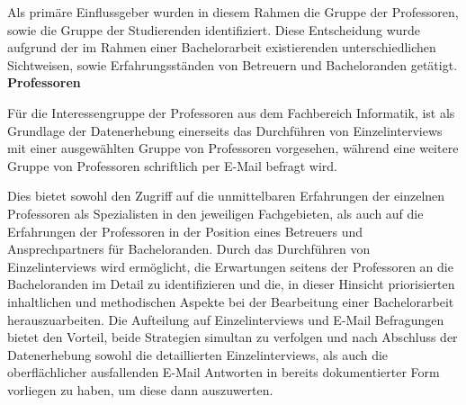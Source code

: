 \documentclass{scrreprt}
\begin{document}
\par Als primäre Einflussgeber wurden in diesem Rahmen die Gruppe der Professoren, sowie die Gruppe der Studierenden identifiziert. Diese Entscheidung wurde aufgrund der im Rahmen einer Bachelorarbeit  existierenden unterschiedlichen Sichtweisen, sowie Erfahrungsständen von Betreuern und Bacheloranden getätigt. \\

\textbf{Professoren}
\par Für die Interessengruppe der Professoren aus dem Fachbereich Informatik, ist als Grundlage der Datenerhebung einerseits das Durchführen von Einzelinterviews mit einer ausgewählten Gruppe von Professoren vorgesehen, während eine weitere Gruppe von Professoren schriftlich per E-Mail befragt wird. 

\par Dies bietet sowohl den Zugriff auf die unmittelbaren Erfahrungen der einzelnen Professoren als Spezialisten in den jeweiligen Fachgebieten, als auch auf die Erfahrungen der Professoren in der Position eines Betreuers und Ansprechpartners für Bacheloranden. Durch das Durchführen von Einzelinterviews wird ermöglicht, die Erwartungen seitens der Professoren an die Bacheloranden im Detail zu identifizieren und die, in dieser Hinsicht priorisierten inhaltlichen und methodischen Aspekte bei der Bearbeitung einer Bachelorarbeit herauszuarbeiten. Die Aufteilung auf Einzelinterviews und E-Mail Befragungen bietet den Vorteil, beide Strategien simultan zu verfolgen und nach Abschluss der Datenerhebung sowohl die detaillierten Einzelinterviews, als auch die oberflächlicher ausfallenden E-Mail Antworten in bereits dokumentierter Form vorliegen zu haben, um diese dann auszuwerten.\\
\end{document}
